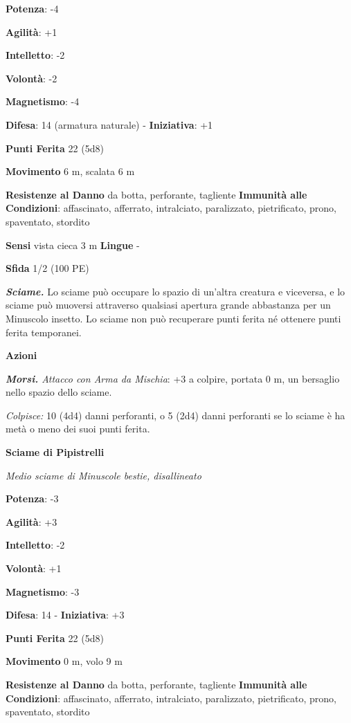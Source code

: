 \begin{multicols}{2}
\textbf{Potenza}: -4

\textbf{Agilità}: +1

\textbf{Intelletto}: -2

\textbf{Volontà}: -2

\textbf{Magnetismo}: -4

\textbf{Difesa}: 14 (armatura naturale) - \textbf{Iniziativa}: +1

\textbf{Punti Ferita} 22 (5d8)

\textbf{Movimento} 6 m, scalata 6 m

\textbf{Resistenze al Danno} da botta, perforante, tagliente
\textbf{Immunità alle Condizioni}: affascinato, afferrato, intralciato,
paralizzato, pietrificato, prono, spaventato, stordito

\textbf{Sensi} vista cieca 3 m \textbf{Lingue} -

\textbf{Sfida} 1/2 (100 PE)\smallskip

\emph{\textbf{Sciame.}} Lo sciame può occupare lo spazio di un'altra
creatura e viceversa, e lo sciame può muoversi attraverso qualsiasi
apertura grande abbastanza per un Minuscolo insetto. Lo sciame non può
recuperare punti ferita né ottenere punti ferita temporanei.

\smallskip\textbf{Azioni}

\emph{\textbf{Morsi.} Attacco con Arma da Mischia}: +3 a colpire,
portata 0 m, un bersaglio nello spazio dello sciame.

\emph{Colpisce:} 10 (4d4) danni perforanti, o 5 (2d4) danni perforanti
se lo sciame è ha metà o meno dei suoi punti ferita.

\textbf{Sciame di Pipistrelli}

\emph{Medio sciame di Minuscole bestie, disallineato}

\textbf{Potenza}: -3

\textbf{Agilità}: +3

\textbf{Intelletto}: -2

\textbf{Volontà}: +1

\textbf{Magnetismo}: -3

\textbf{Difesa}: 14 - \textbf{Iniziativa}: +3

\textbf{Punti Ferita} 22 (5d8)

\textbf{Movimento} 0 m, volo 9 m

\textbf{Resistenze al Danno} da botta, perforante, tagliente
\textbf{Immunità alle Condizioni}: affascinato, afferrato, intralciato,
paralizzato, pietrificato, prono, spaventato, stordito


\end{multicols}
